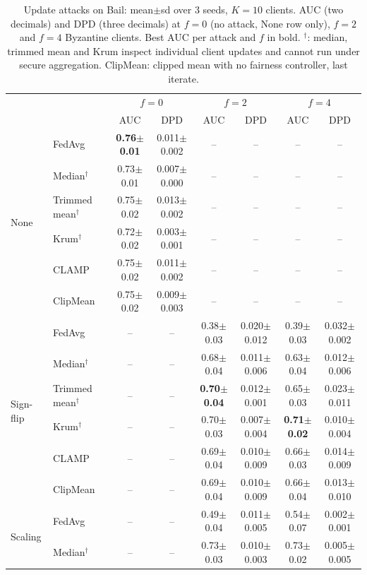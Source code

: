 \begin{table}[tbp]
\centering
\scriptsize
\setlength{\tabcolsep}{2pt}
\caption{Update attacks on Bail: mean$\pm$sd over 3 seeds, $K=10$ clients. AUC (two decimals) and DPD (three decimals) at $f=0$ (no attack, None row only), $f=2$ and $f=4$ Byzantine clients. Best AUC per attack and $f$ in bold. $^\dagger$: median, trimmed mean and Krum inspect individual client updates and cannot run under secure aggregation. ClipMean: clipped mean with no fairness controller, last iterate.}
\label{tab:e3_bail}
\begin{tabular}{llcccccc}
\toprule
 & & \multicolumn{2}{c}{$f=0$} & \multicolumn{2}{c}{$f=2$} & \multicolumn{2}{c}{$f=4$} \\
 & & AUC & DPD & AUC & DPD & AUC & DPD \\
\midrule
\multirow{6}{*}{None} & FedAvg & \textbf{0.76$\pm$0.01} & 0.011$\pm$0.002 & -- & -- & -- & -- \\
 & Median$^\dagger$ & 0.73$\pm$0.01 & 0.007$\pm$0.000 & -- & -- & -- & -- \\
 & Trimmed mean$^\dagger$ & 0.75$\pm$0.02 & 0.013$\pm$0.002 & -- & -- & -- & -- \\
 & Krum$^\dagger$ & 0.72$\pm$0.02 & 0.003$\pm$0.001 & -- & -- & -- & -- \\
 & CLAMP & 0.75$\pm$0.02 & 0.011$\pm$0.002 & -- & -- & -- & -- \\
 & ClipMean & 0.75$\pm$0.02 & 0.009$\pm$0.003 & -- & -- & -- & -- \\
\midrule
\multirow{6}{*}{Sign-flip} & FedAvg & -- & -- & 0.38$\pm$0.03 & 0.020$\pm$0.012 & 0.39$\pm$0.03 & 0.032$\pm$0.002 \\
 & Median$^\dagger$ & -- & -- & 0.68$\pm$0.04 & 0.011$\pm$0.006 & 0.63$\pm$0.04 & 0.012$\pm$0.006 \\
 & Trimmed mean$^\dagger$ & -- & -- & \textbf{0.70$\pm$0.04} & 0.012$\pm$0.001 & 0.65$\pm$0.03 & 0.023$\pm$0.011 \\
 & Krum$^\dagger$ & -- & -- & 0.70$\pm$0.03 & 0.007$\pm$0.004 & \textbf{0.71$\pm$0.02} & 0.010$\pm$0.004 \\
 & CLAMP & -- & -- & 0.69$\pm$0.04 & 0.010$\pm$0.009 & 0.66$\pm$0.03 & 0.014$\pm$0.009 \\
 & ClipMean & -- & -- & 0.69$\pm$0.04 & 0.010$\pm$0.009 & 0.66$\pm$0.04 & 0.013$\pm$0.010 \\
\midrule
\multirow{6}{*}{Scaling} & FedAvg & -- & -- & 0.49$\pm$0.04 & 0.011$\pm$0.005 & 0.54$\pm$0.07 & 0.002$\pm$0.001 \\
 & Median$^\dagger$ & -- & -- & 0.73$\pm$0.03 & 0.010$\pm$0.003 & 0.73$\pm$0.02 & 0.005$\pm$0.005 \\

\end{tabular}
\end{table}
